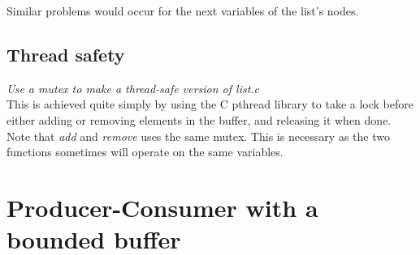 \documentclass[a4paper, titlepage]{article}
\begin{document}
Similar problems would
occur for the next variables of the list's nodes.

\subsection{Thread safety}
\textit{Use a mutex to make a thread-safe version of list.c}\\

This is achieved quite simply by using the C pthread library to take a lock
before either adding or removing elements in the buffer, and releasing it when
done. Note that \emph{add} and \emph{remove} uses the same mutex. This is
necessary as the two functions sometimes will operate on the same variables.

\section{Producer-Consumer with a bounded buffer}

\pagebreak
[name=prod]





\end{document}

